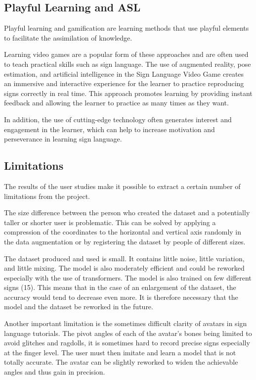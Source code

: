 \subsection{Playful Learning and ASL}

Playful learning and gamification are learning methods that use playful elements to facilitate the assimilation of knowledge. 

Learning video games are a popular form of these approaches and are often used to teach practical skills such as sign language. The use of augmented reality, pose estimation, and artificial intelligence in the Sign Language Video Game creates an immersive and interactive experience for the learner to practice reproducing signs correctly in real time. This approach promotes learning by providing instant feedback and allowing the learner to practice as many times as they want. 

In addition, the use of cutting-edge technology often generates interest and engagement in the learner, which can help to increase motivation and perseverance in learning sign language.

\subsection{Limitations}

The results of the user studies make it possible to extract a certain number of limitations from the project.

The size difference between the person who created the dataset and a potentially taller or shorter user is problematic. This can be solved by applying a compression of the coordinates to the horizontal and vertical axis randomly in the data augmentation or by registering the dataset by people of different sizes.

The dataset produced and used is small. It contains little noise, little variation, and little mixing. The model is also moderately efficient and could be reworked especially with the use of transformers. The model is also trained on few different signs (15). This means that in the case of an enlargement of the dataset, the accuracy would tend to decrease even more. It is therefore necessary that the model and the dataset be reworked in the future.

Another important limitation is the sometimes difficult clarity of avatars in sign language tutorials. The pivot angles of each of the avatar's bones being limited to avoid glitches and ragdolls, it is sometimes hard to record precise signs especially at the finger level. The user must then imitate and learn a model that is not totally accurate. The avatar can be slightly reworked to widen the achievable angles and thus gain in precision.

